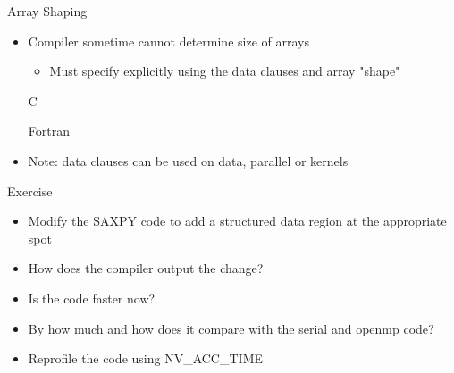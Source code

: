 \documentclass[10pt,t]{beamer}
\begin{document}
\begin{frame}[fragile]{Array Shaping}
  \begin{itemize}
    \item Compiler sometime cannot determine size of arrays
    \begin{itemize}
      \item Must specify explicitly using the data clauses and array "shape"
    \end{itemize}
    \item[C] 
    \item[Fortran] 
    \item Note: data clauses can be used on data, parallel or kernels
  \end{itemize}
\end{frame}

\begin{frame}[c]{Exercise}
  \begin{itemize}
    \item Modify the SAXPY code to add a structured data region at the appropriate spot
    \item How does the compiler output the change?
    \item Is the code faster now? 
    \item By how much and how does it compare with the serial and openmp code?
    \item Reprofile the code using NV\_ACC\_TIME
  \end{itemize}
\end{frame}
\end{document}
